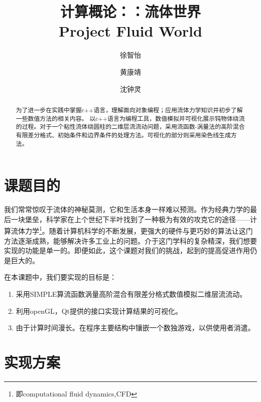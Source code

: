 \documentclass[12pt]{article}
\title{计算概论：：流体世界\\ Project Fluid World}
\author{徐智怡 \and 黄康靖 \and 沈钟灵}
\begin{document}
\maketitle
\begin{abstract}
为了进一步在实践中掌握c++语言，理解面向对象编程；应用流体力学知识并初步了解一些数值方法的相关内容。
以c++语言为编程工具，数值模拟并可视化展示钝物体绕流的过程。对于一个粘性流体绕圆柱的二维层流流动问题，采用流函数-涡量法的高阶混合有限差分格式、初始条件和边界条件的处理方法。可视化的部分则采用染色线生成方法。\end{abstract}
\newpage
\tableofcontents
\newpage
\section{课题目的}
我们常常惊叹于流体的神秘莫测，它和生活本身一样难以预测。作为经典力学的最后一块堡垒，科学家在上个世纪下半叶找到了一种极为有效的攻克它的途径——计算流体力学\footnote{即computational fluid dynamics,CFD}。随着计算机科学的不断发展，更强大的硬件与更巧妙的算法让这门方法逐渐成熟，能够解决许多工业上的问题。介于这门学科的复杂精深，我们想要实现的功能是单一的。即便如此，这个课题对我们的挑战，起到的提高促进作用仍是巨大的。

在本课题中，我们要实现的目标是：
\begin{enumerate}
\item 采用SIMPLE算流函数涡量高阶混合有限差分格式数值模拟二维层流流动。
\item 利用openGL，Qt提供的接口实现计算结果的可视化。
\item 由于计算时间漫长。在程序主要结构中镶嵌一个数独游戏，以供使用者消遣。
\end{enumerate}

\section{实现方案}
\end{document}
